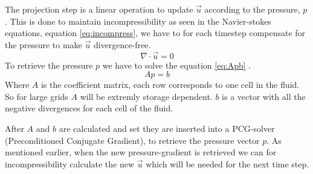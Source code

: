 The projection step is a linear operation to update $\vec{u}$ according to the pressure, $p$.
This is done to maintain incompressibility as seen in the Navier-stokes equations, equation \ref{eq:incompress}, we have to for each timestep compensate for the pressure to make $\vec{u}$ divergence-free.
\begin{equation}
\label{eq:incompress}
	\nabla\cdot \vec{u}= 0
\end{equation}
To retrieve the pressure $p$ we have to solve the equation \eqref{eq:Apb} \cite{bridson}.
\begin{equation}
\label{eq:Apb}
	Ap = b
\end{equation}
Where $A$ is the coefficient matrix, each row corresponds to one cell in the fluid. So for large grids $A$ will be extremly storage dependent. $b$ is a vector with all the negative divergences for each cell of the fluid. 

After $A$ and $b$ are calculated and set they are inserted into a PCG-solver (Preconditioned Conjugate Gradient), to retrieve the pressure vector $p$.
As mentioned earlier, when the new pressure-gradient is retrieved we can for incompressibility calculate the new $\vec{u}$ which will be needed for the next time step.

